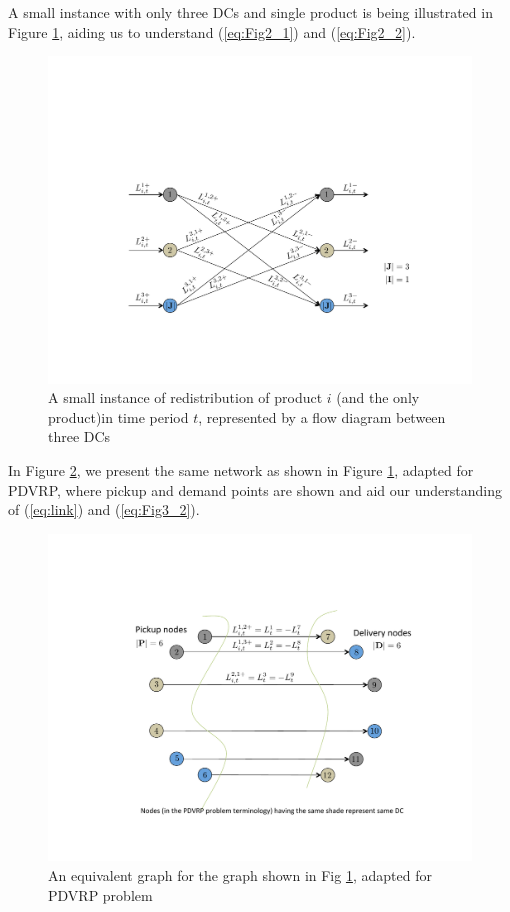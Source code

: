 \documentclass[12pt,a4paper]{article}
\begin{document}
A small instance with only three DCs and single product is being illustrated in Figure \ref{fig:redistribution_producti_all3DCs}, aiding us to understand (\ref{eq:Fig2_1}) and (\ref{eq:Fig2_2}).
\begin{figure}[H]
\centering
\includegraphics[trim=3cm 4cm 3cm 7cm, clip=true, totalheight=0.2\textheight]{Fig2.pdf}
\caption{A small instance of redistribution of product $i$ (and the only product)in time period $t$, represented by a flow diagram between three DCs}
\label{fig:redistribution_producti_all3DCs}
\end{figure}
In Figure \ref{fig:PDVRP_total12nodes}, we present the same network as shown in Figure \ref{fig:redistribution_producti_all3DCs}, adapted for PDVRP, where pickup and demand points are shown and aid our understanding of (\ref{eq:link}) and (\ref{eq:Fig3_2}).
\begin{figure}[H]
\centering
\includegraphics[trim=3cm 3cm 3cm 5cm, clip=true, totalheight=0.2\textheight]{Fig3.pdf}
\caption{An equivalent graph for the graph shown in Fig \ref{fig:redistribution_producti_all3DCs}, adapted for PDVRP problem}
\label{fig:PDVRP_total12nodes}
\end{figure}
\end{document}
